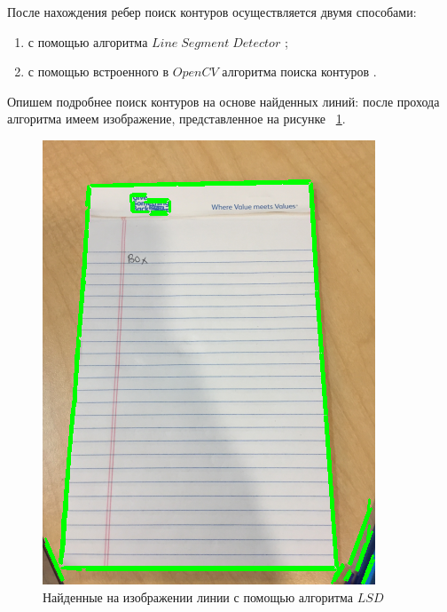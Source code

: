 После нахождения ребер поиск контуров осуществляется двумя способами:
\begin{enumerate}
    \item с помощью алгоритма $Line\;Segment\;Detector$ \cite{lsd};
    \item с помощью встроенного в $OpenCV$ алгоритма поиска контуров \cite{opencv_contours}.
\end{enumerate}

Опишем подробнее поиск контуров на основе найденных линий: после прохода алгоритма имеем изображение, представленное на рисунке ~\ref{lsd_img}.
\begin{figure}
    \includegraphics[scale=0.25]{img/perspective/lsd.png}
    \caption{Найденные на изображении линии с помощью алгоритма $LSD$}
    \label{lsd_img}
\end{figure}

